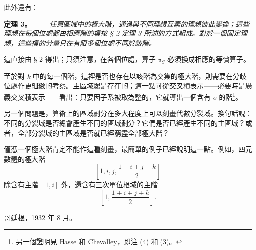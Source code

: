 \documentclass[11pt]{article}
\begin{document}
此外還有：

\medskip
\noindent\textbf{定理 3。——} \emph{任意區域中的極大階，通過與不同理想互素的理想彼此變換；這些理想在每個位處都由相應階的模按 § 2 定理 3 所述的方式組成。對於一個固定理想，這些模的分量只在有限多個位處不同於該階。}

這直接由 § 2 得出；只須注意，在各個位處，算子 \(u_S\) 必須換成相應的等價算子。

至於對 \(k\) 中的每一個階，這裡是否也存在以該階為交集的極大階，則需要在分歧位處作更細緻的考察。主區域總是存在的；這一點可從交叉積表示——必要時是廣義交叉積表示——看出：只要因子系被取為整的，它就導出一個含有 \(o\) 的階\footnote{另一個證明見 Hasse 和 Chevalley，即注 (4) 和 (3)。}。

另一個問題是，算術上的區域劃分在多大程度上可以刻畫代數分裂域。換句話說：不同的分裂域是否總會產生不同的區域劃分？它們是否已經產生不同的主區域？或者，全部分裂域的主區域是否就已經窮盡全部極大階？

僅憑一個極大階肯定不能作這種刻畫，最簡單的例子已經說明這一點。例如，四元數體的極大階
\[
\left[1,i,j,\frac{1+i+j+k}{2}\right]
\]
除含有主階 \([1,i]\) 外，還含有三次單位根域的主階
\[
\left[1,\frac{1+i+j+k}{2}\right].
\]

\begin{flushleft}
哥廷根，1932 年 8 月。
\end{flushleft}
\end{document}
